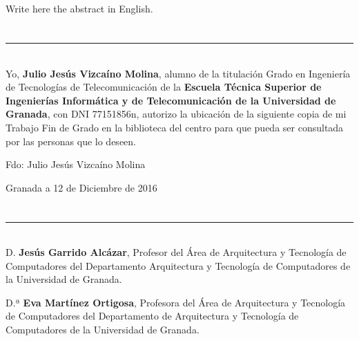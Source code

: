 \\

\vspace{0.7cm}
\\

Write here the abstract in English.

\chapter*{}
\thispagestyle{empty}

\noindent\rule[-1ex]{\textwidth}{2pt}\\[4.5ex]

Yo, \textbf{Julio Jesús Vizcaíno Molina}, alumno de la titulación Grado en Ingeniería de Tecnologías de Telecomunicación de la \textbf{Escuela Técnica Superior de Ingenierías Informática y de Telecomunicación de la Universidad de Granada}, con DNI 77151856n, autorizo la ubicación de la siguiente copia de mi Trabajo Fin de Grado en la biblioteca del centro para que pueda ser consultada por las personas que lo deseen.

\vspace{6cm}

\noindent Fdo: Julio Jesús Vizcaíno Molina

\vspace{2cm}

\begin{flushright}
Granada a 12 de Diciembre de 2016
\end{flushright}


\chapter*{}
\thispagestyle{empty}

\noindent\rule[-1ex]{\textwidth}{2pt}\\[4.5ex]

D. \textbf{Jesús Garrido Alcázar}, Profesor del Área de Arquitectura y Tecnología de Computadores del Departamento Arquitectura y Tecnología de Computadores de la Universidad de Granada.

\vspace{0.5cm}

D.ª \textbf{Eva Martínez Ortigosa}, Profesora del Área de Arquitectura y Tecnología de Computadores del Departamento de Arquitectura y Tecnología de Computadores de la Universidad de Granada.



